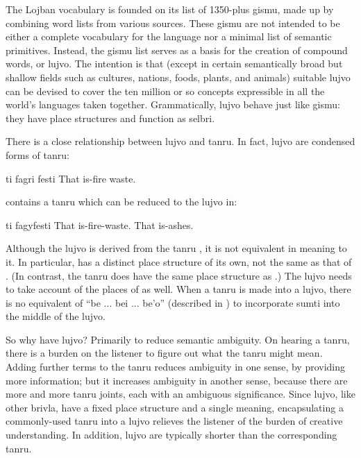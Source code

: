 The Lojban vocabulary is founded on its list of 1350-plus
    gismu, made up by combining word lists from various sources.
    These gismu are not intended to be either a complete vocabulary
    for the language nor a minimal list of semantic primitives.
    Instead, the gismu list serves as a basis for the creation of
    compound words, or lujvo. The intention is that (except in
    certain semantically broad but shallow fields such as cultures,
    nations, foods, plants, and animals) suitable lujvo can be
    devised to cover the ten million or so concepts expressible in
    all the world's languages taken together. Grammatically, lujvo
    behave just like gismu: they have place structures and function
    as selbri.

There is a close relationship between lujvo and tanru. In
    fact, lujvo are condensed forms of tanru:
\begin{example}
ti fagri festi\n
That is-fire waste.
\end{example}

{\noindent}contains a tanru which can be reduced to the lujvo in:
\begin{example}
ti fagyfesti\n
That is-fire-waste.\n
That is-ashes.
\end{example}

Although the lujvo  is derived from the tanru
    , it is not equivalent in meaning to it. In
    particular,  has a distinct place structure of its
    own, not the same as that of . (In contrast, the tanru
    does have the same place structure as .) The lujvo
    needs to take account of the places of  as well. When
    a tanru is made into a lujvo, there is no equivalent of ``be
    ... bei ... be'o'' (described in ) to incorporate sumti into the middle of the lujvo.

So why have lujvo? Primarily to reduce semantic ambiguity.
    On hearing a tanru, there is a burden on the listener to figure
    out what the tanru might mean. Adding further terms to the
    tanru reduces ambiguity in one sense, by providing more
    information; but it increases ambiguity in another sense,
    because there are more and more tanru joints, each with an
    ambiguous significance. Since lujvo, like other brivla, have a
    fixed place structure and a single meaning, encapsulating a
    commonly-used tanru into a lujvo relieves the listener of the
    burden of creative understanding. In addition, lujvo are
    typically shorter than the corresponding tanru.

